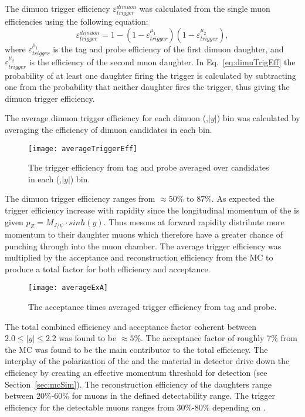       The dimuon trigger efficiency $\varepsilon^{dimuon}_{trigger}$ was 
        calculated from the single muon efficiencies using the following
        equation:
      \begin{equation}
        \label{eq:dimuTrigEff}
        \varepsilon^{dimuon}_{trigger}=1-(1-\varepsilon_{trigger}^{\mu_{1}})(1-\varepsilon_{trigger}^{\mu_{2}}),
      \end{equation}
      where $\varepsilon_{trigger}^{\mu_{1}}$ is the tag and probe efficiency
        of the first dimuon daughter, and $\varepsilon_{trigger}^{\mu_{2}}$ is
        the efficiency of the second muon daughter. 
      In Eq.~\ref{eq:dimuTrigEff} the probability of at least one daughter
        firing the trigger is calculated by subtracting one from the
        probability that neither daughter fires the trigger,
        thus giving the dimuon trigger efficiency. 

      The average dimuon trigger efficiency for each dimuon (\pt{},$|y|$) bin
        was calculated by averaging the efficiency of dimuon candidates in each
        bin. 
      \begin{figure}[!Hhbt]
        \centering
        \texttt{[image: averageTriggerEff]}
        \caption{The trigger efficiency from tag and probe averaged over candidates
          in each (\pt{},$|y|$) bin.}
        \label{fig:avTrigEffCo}
      \end{figure}
      The dimuon trigger efficiency ranges from $\approx 50$\% to 87\%. 
      As expected the \JPsi{} trigger efficiency increase with rapidity since 
        the longitudinal momentum of the \JPsi{} is given 
        $p_Z= M_{J/\psi} \cdot sinh(y)$. 
      Thus \JPsi{} mesons at forward rapidity distribute more momentum to their
        daughter muons which therefore have a greater chance of punching 
        through into the muon chamber.  
      The average trigger efficiency was multiplied by the acceptance and 
        reconstruction efficiency from the MC to produce a total factor for 
        both efficiency and acceptance. 
      \begin{figure}[!Hhtb]
        \centering
        \texttt{[image: averageExA]}
        \caption{The acceptance times averaged trigger efficiency from tag and 
          probe.}
        \label{fig:avAccEff}
      \end{figure}

      The total combined efficiency and acceptance factor coherent \JPsi{} 
        between $2.0 \le |y| \le 2.2$ was found to be $\approx 5$\%.
      The acceptance factor of roughly 7\% from the MC was found to be the main
        contributor to the total efficiency. 
      The interplay of the polarization of the \JPsi{} and the material in 
        detector drive down the efficiency by creating an effective momentum 
        threshold for detection (see Section~\ref{sec:mcSim}).
      The reconstruction efficiency of the daughters range between 
        20\%-60\% for muons in the defined detectability range. 
      The trigger efficiency for the detectable muons ranges from 30\%-80\% 
        depending on \pt{}. 

